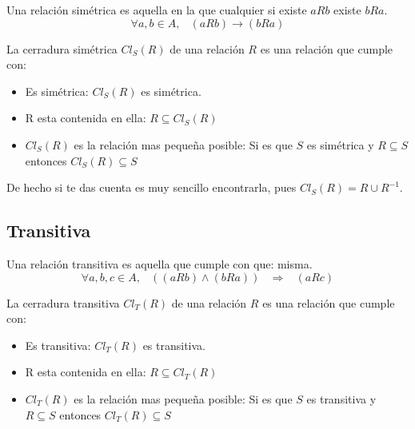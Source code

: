 \documentclass[12pt, fleqn]{report}                             %
\DeclareMathOperator \Space {\quad}                             %
\DeclareMathOperator \MiniSpace {\;}                            %
\newcommand \lequal {\MiniSpace \Leftrightarrow \MiniSpace}     %
\newcommand \linfire {\MiniSpace \Rightarrow \MiniSpace}        %
\begin{document}
                Una relación simétrica es aquella en la que cualquier si existe $aRb$ existe $bRa$.
                \begin{equation}
                    \forall a,b \in A,\MiniSpace (aRb) \to (bRa)
                \end{equation}


                La cerradura simétrica $Cl_S(R)$ de una relación $R$ es una relación que cumple con:

                \begin{itemize}
                    \item Es simétrica: $Cl_S(R)$ es simétrica. 
                    \item R esta contenida en ella: $R \subseteq Cl_S(R)$
                    \item $Cl_S(R)$ es la relación mas pequeña posible: 
                    Si es que $S$ es simétrica y $R \subseteq S$ entonces $Cl_S(R) \subseteq S$
                \end{itemize}



                De hecho si te das cuenta es muy sencillo encontrarla, pues
                $Cl_S(R) = R \cup R^{-1}$.



            \clearpage
            \subsection{Transitiva}

                Una relación transitiva es aquella que cumple con que:
                misma.
                \begin{equation}
                    \forall a,b,c \in A, \MiniSpace ((aRb) \land (bRa)) \linfire (aRc)
                \end{equation}

                La cerradura transitiva $Cl_T(R)$ de una relación $R$ es una relación que cumple con:

                \begin{itemize}
                    \item Es transitiva: $Cl_T(R)$ es transitiva. 
                    \item R esta contenida en ella: $R \subseteq Cl_T(R)$
                    \item $Cl_T(R)$ es la relación mas pequeña posible: 
                    Si es que $S$ es transitiva y $R \subseteq S$ entonces $Cl_T(R) \subseteq S$
                \end{itemize}
\end{document}

